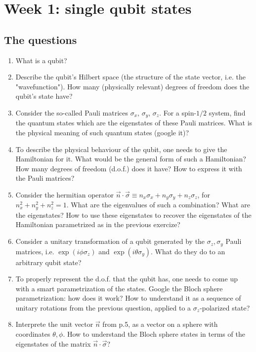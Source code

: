 \documentclass[11pt, a4paper, tightenlines, notitlepage]{revtex4-1}
\begin{document}
\section*{Week 1: single qubit states}
\subsection*{The questions}

\begin{enumerate}

\item What is a qubit?

\item Describe the qubit's Hilbert space (the structure of the state vector, i.e. the "wavefunction"). How many (physically relevant) degrees of freedom does the qubit's state have?

\item Consider the so-called Pauli matrices $\sigma_x$, $\sigma_y$, $\sigma_z$. For a spin-$1/2$ system, find the quantum states which are the eigenstates of these Pauli matrices. What is the physical meaning of such quantum states (google it)? 

\item To describe the physical behaviour of the qubit, one needs to give the Hamiltonian for it. What would be the general form of such a Hamiltonian? How many degrees of freedom (d.o.f.) does it have? How to express it with the Pauli matrices?

\item Consider the hermitian operator $\vec{n}\cdot\vec{\sigma}\equiv n_x\sigma_x+n_y\sigma_y+n_z\sigma_z$, for $n^2_x+n^2_y+n^2_z=1$. What are the eigenvalues of such a combination? What are the eigenstates? How to use these eigenstates to recover the eigenstates of the Hamiltonian parametrized as in the previous exercize?

\item Consider a unitary transformation of a qubit generated by the $\sigma_z, \sigma_y$ Pauli matrices, i.e. $\exp(i\phi\sigma_z)$ and $\exp(i\theta\sigma_y)$. What do they do to an arbitrary qubit state?

\item To properly represent the d.o.f. that the qubit has, one needs to come up with a smart parametrization of the states. Google the Bloch sphere parametrization: how does it work? How to understand it as a sequence of unitary rotations from the previous question, applied to a $\sigma_z$-polarized state?

\item Interprete the unit vector $\vec{n}$ from p.5, as a vector on a sphere with coordinates $\theta,\phi$. How to understand the Bloch sphere states in terms of the eigenstates of the matrix $\vec{n}\cdot\vec{\sigma}$?

\end{enumerate}
\end{document}
